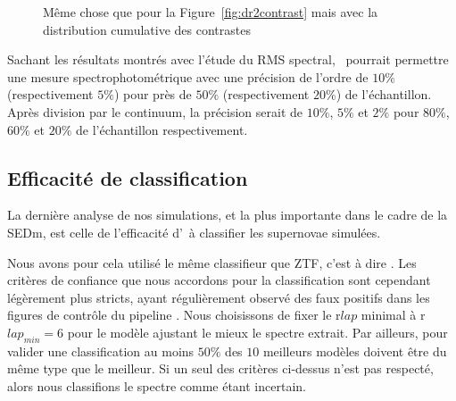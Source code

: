 \documentclass[../main/main.tex]{subfiles}
\begin{document}
\begin{figure}[ht]
  \centering
  \caption[Distribution cumulative du contraste des SNeIa de la DR2 de
  ZTF-Cosmo.]{Même chose que pour la Figure~\ref{fig:dr2contrast} mais
    avec la distribution cumulative des contrastes}
  \label{fig:dr2contrast_cum}
\end{figure}

Sachant les résultats montrés avec l'étude du RMS spectral, \hypergal\
pourrait permettre une mesure spectrophotométrique avec une précision de
l'ordre de $10\%$ (respectivement $5\%$) pour près de $50\%$
(respectivement $20\%$) de l'échantillon.
Après division par le continuum, la précision serait de $10\%$, $5\%$ et $2\%$ pour
$80\%$, $60\%$ et $20\%$ de l'échantillon respectivement.


\subsection{Efficacité de classification}\label{ssec:typingsimu}

La dernière analyse de nos simulations, et la plus importante dans le
cadre de la SEDm, est celle de l'efficacité d'\hypergal\ à classifier
les supernovae simulées.

Nous avons pour cela utilisé le même classifieur que ZTF, c'est à dire
\pkg{SNID}. Les critères de confiance que nous accordons pour la classification
sont cependant légèrement plus stricts, ayant régulièrement observé
des faux positifs dans les figures de contrôle du pipeline \pysedm. Nous
choisissons de fixer le r$lap$ minimal à r$lap_{min}=6$ pour le modèle
ajustant le mieux le spectre extrait. Par ailleurs, pour valider une
classification au moins $50\%$ des $10$ meilleurs modèles doivent être
du même type que le meilleur. Si un seul des critères ci-dessus n'est pas
respecté, alors nous classifions le spectre comme étant incertain.\\
\end{document}
